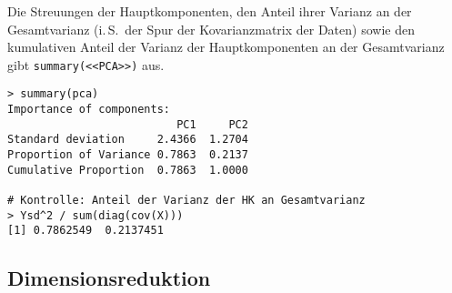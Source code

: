 Die Streuungen der Hauptkomponenten, den Anteil ihrer Varianz an der Gesamtvarianz (i.\,S.\ der Spur der Kovarianzmatrix der Daten) sowie den kumulativen Anteil der Varianz der Hauptkomponenten an der Gesamtvarianz gibt \lstinline!summary(<<PCA>>)! aus.
\begin{lstlisting}
> summary(pca)
Importance of components:
                          PC1     PC2
Standard deviation     2.4366  1.2704
Proportion of Variance 0.7863  0.2137
Cumulative Proportion  0.7863  1.0000

# Kontrolle: Anteil der Varianz der HK an Gesamtvarianz
> Ysd^2 / sum(diag(cov(X)))
[1] 0.7862549  0.2137451
\end{lstlisting}

\subsection{Dimensionsreduktion}
\label{sec:pcaDimReduce}

